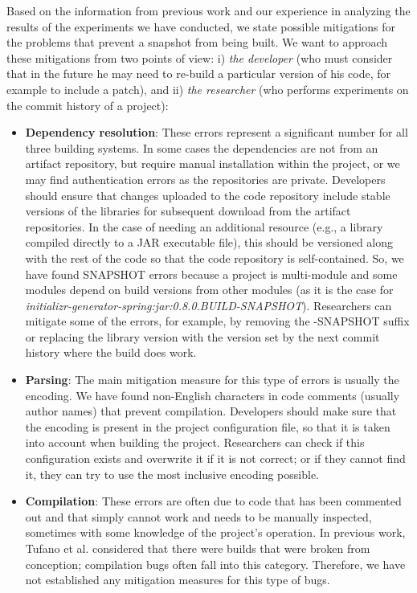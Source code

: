 Based on the information from previous work and our experience in analyzing the results of the experiments we have conducted, we state possible mitigations for the problems that prevent a snapshot from being built. We want to approach these mitigations from two points of view: i) \textit{the developer} (who must consider that in the future he may need to re-build a particular version of his code, for example to include a patch), and ii) \textit{the researcher} (who performs experiments on the commit history of a project):

\begin{itemize}
    \item \textbf{Dependency resolution}: These errors represent a significant number for all three building systems. In some cases the dependencies are not from an artifact repository, but require manual installation within the project, or we may find authentication errors as the repositories are private. Developers should ensure that changes uploaded to the code repository include stable versions of the libraries for subsequent download from the artifact repositories. In the case of needing an additional resource (e.g., a library compiled directly to a JAR executable file), this should be versioned along with the rest of the code so that the code repository is self-contained. So, we have found SNAPSHOT errors because a project is multi-module and some modules depend on build versions from other modules (as it is the case for \textit{initializr-generator-spring:jar:0.8.0.BUILD-SNAPSHOT}). Researchers can mitigate some of the errors, for example, by removing the -SNAPSHOT suffix or replacing the library version with the version set by the next commit history where the build does work.
    \item \textbf{Parsing}: The main mitigation measure for this type of errors is usually the encoding. We have found non-English characters in code comments (usually author names) that prevent compilation. Developers should make sure that the encoding is present in the project configuration file, so that it is taken into account when building the project. Researchers can check if this configuration exists and overwrite it if it is not correct; or if they cannot find it, they can try to use the most inclusive encoding possible.
    \item \textbf{Compilation}: These errors are often due to code that has been commented out and that simply cannot work and needs to be manually inspected, sometimes with some knowledge of the project's operation. In previous work, Tufano et al. considered that there were builds that were broken from conception; compilation bugs often fall into this category. Therefore, we have not established any mitigation measures for this type of bugs.

\end{itemize}

